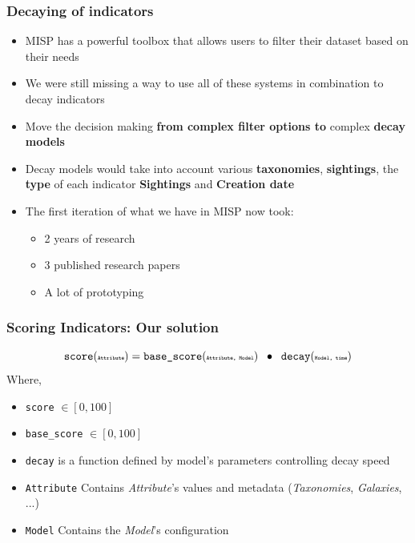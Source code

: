 \begin{frame}
  \frametitle{Decaying of indicators}
  \begin{itemize}
    \item MISP has a powerful toolbox that allows users to filter their dataset based on their needs
    \item We were still missing a way to use all of these systems in combination to decay indicators
    \item Move the decision making \textbf{from complex filter options to} complex \textbf{decay models}
    \item Decay models would take into account various \textbf{taxonomies}, \textbf{sightings}, the \textbf{type} of each indicator \textbf{Sightings} and \textbf{Creation date}
    \item The first iteration of what we have in MISP now took:
    \begin{itemize}
       \item 2 years of research
       \item 3 published research papers
       \item A lot of prototyping
    \end{itemize}
  \end{itemize}
\end{frame}

\begin{frame}
    \frametitle{Scoring Indicators: Our solution}
    $$ \texttt{score}(\texttt{\tiny Attribute}) = \texttt{base\_score}(\texttt{\tiny Attribute, Model}) \;\;\bullet\;\; \texttt{decay}(\texttt{\tiny Model, time}) $$
    Where,\vspace{0.5cm}
    \begin{itemize}
        \item \texttt{score} $ \in [0, 100] $
        \item \texttt{base\_score} $ \in [0, 100] $
        \item \texttt{decay} is a function defined by model's parameters controlling decay speed
        \item \texttt{Attribute} Contains \textit{Attribute}'s values and metadata {\scriptsize (\textit{Taxonomies}, \textit{Galaxies}, ...)}
        \item \texttt{Model} Contains the \textit{Model}'s configuration
    \end{itemize}
\end{frame}

